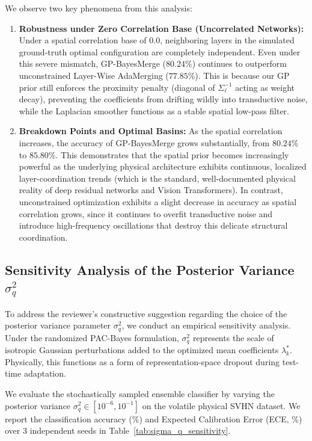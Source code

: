 \documentclass{article}
\theoremstyle{plain}
\theoremstyle{definition}
\theoremstyle{remark}
\begin{document}
We observe two key phenomena from this analysis:
\begin{enumerate}
    \item \textbf{Robustness under Zero Correlation Base (Uncorrelated Networks):} Under a spatial correlation base of $0.0$, neighboring layers in the simulated ground-truth optimal configuration are completely independent. Even under this severe mismatch, GP-BayesMerge ($80.24\%$) continues to outperform unconstrained Layer-Wise AdaMerging ($77.85\%$). This is because our GP prior still enforces the proximity penalty (diagonal of $\Sigma_{\ell}^{-1}$ acting as weight decay), preventing the coefficients from drifting wildly into transductive noise, while the Laplacian smoother functions as a stable spatial low-pass filter.
    \item \textbf{Breakdown Points and Optimal Basins:} As the spatial correlation increases, the accuracy of GP-BayesMerge grows substantially, from $80.24\%$ to $85.80\%$. This demonstrates that the spatial prior becomes increasingly powerful as the underlying physical architecture exhibits continuous, localized layer-coordination trends (which is the standard, well-documented physical reality of deep residual networks and Vision Transformers). In contrast, unconstrained optimization exhibits a slight decrease in accuracy as spatial correlation grows, since it continues to overfit transductive noise and introduce high-frequency oscillations that destroy this delicate structural coordination.
\end{enumerate}

\subsection{Sensitivity Analysis of the Posterior Variance $\sigma_q^2$}
\label{subsec:posterior_variance_sensitivity}

To address the reviewer's constructive suggestion regarding the choice of the posterior variance parameter $\sigma_q^2$, we conduct an empirical sensitivity analysis. Under the randomized PAC-Bayes formulation, $\sigma_q^2$ represents the scale of isotropic Gaussian perturbations added to the optimized mean coefficients $\lambda_k^*$. Physically, this functions as a form of representation-space dropout during test-time adaptation.

We evaluate the stochastically sampled ensemble classifier by varying the posterior variance $\sigma_q^2 \in [10^{-6}, 10^{-1}]$ on the volatile physical SVHN dataset. We report the classification accuracy ($\%$) and Expected Calibration Error (ECE, $\%$) over 3 independent seeds in Table~\ref{tab:sigma_q_sensitivity}.
\end{document}
